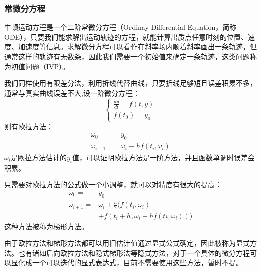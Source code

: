 \documentclass[UTF8,a4paper,10pt]{ctexart}
\begin{document}
\begin{multicols}{2}
            \subsubsection{常微分方程}
            牛顿运动方程是一个二阶常微分方程（Ordinay Differential Equation，简称ODE），只要我们能求解出运动轨迹的方程，就能计算出质点任意时刻的位置、速度、加速度等信息。求解微分方程可以看作在斜率场内顺着斜率画出一条轨迹，但通常这样的轨迹有无数条，因此我们需要一个初始值来确定一条轨迹，这类问题称为初值问题（IVP）。\par
            我们同样使用有限差分法，利用折线代替曲线，只要折线足够短且误差积累不多，通常与真实曲线误差不大,设一阶微分方程：
            \begin{equation}
                \left\{ \begin{array}{l}
                    \frac{dy}{dt} = f(t,y)\\
                    f(t_0) = y_0
                \end{array}\right.
            \end{equation}
            则有欧拉方法：
            \begin{equation}
                \begin{split}
                    \omega_0 =& y_0\\
                    \omega_{i+1} =& \omega_i + hf(t_i,\omega_i)
                \end{split}
            \end{equation}
            $\omega_i$是欧拉方法估计的$y_i$值，可以证明欧拉方法是一阶方法，并且函数单调时误差会积累。\par
            只需要对欧拉方法的公式做一个小调整，就可以对精度有很大的提高：
            \begin{equation}
                \begin{split}
                    \omega_0 =& y_0\\
                    \omega_{i+1} =& \omega_i + \frac{h}{2}(f(t_i,\omega_i)\\
                    &+f(t_i+h,\omega_i+hf(ti,\omega_i)))
                \end{split}
            \end{equation}
            这种方法被称为梯形方法。\par
            由于欧拉方法和梯形方法都可以用旧估计值通过显式公式确定，因此被称为显式方法。也有诸如后向欧拉方法和隐式梯形法等隐式方法，对于一个具体的微分方程可以显化成一个可以迭代的显式表达式，目前不需要使用这些方法，暂时不提。\par

\end{multicols}
\end{document}
